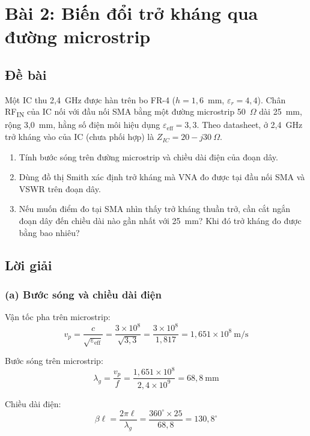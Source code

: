 \documentclass[12pt,a4paper]{article}
\begin{document}
\newpage
\section{Bài 2: Biến đổi trở kháng qua đường microstrip}

\subsection{Đề bài}
Một IC thu 2,4~GHz được hàn trên bo FR-4 ($h = 1{,}6$~mm, $\varepsilon_r = 4{,}4$). Chân RF\textsubscript{IN} của IC nối với đầu nối SMA bằng một đường microstrip 50~$\Omega$ dài 25~mm, rộng 3,0~mm, hằng số điện môi hiệu dụng $\varepsilon_{\text{eff}} = 3{,}3$. Theo datasheet, ở 2,4~GHz trở kháng vào của IC (chưa phối hợp) là $Z_{IC} = 20 - j30~\Omega$.

\begin{enumerate}[label=(\alph*)]
    \item Tính bước sóng trên đường microstrip và chiều dài điện của đoạn dây.
    \item Dùng đồ thị Smith xác định trở kháng mà VNA đo được tại đầu nối SMA và VSWR trên đoạn dây.
    \item Nếu muốn điểm đo tại SMA nhìn thấy trở kháng thuần trở, cần cắt ngắn đoạn dây đến chiều dài nào gần nhất với 25~mm? Khi đó trở kháng đo được bằng bao nhiêu?
\end{enumerate}

\subsection{Lời giải}

\subsubsection{(a) Bước sóng và chiều dài điện}

Vận tốc pha trên microstrip:
\[
v_p = \frac{c}{\sqrt{\varepsilon_{\text{eff}}}} = \frac{3 \times 10^8}{\sqrt{3{,}3}} = \frac{3 \times 10^8}{1{,}817} = 1{,}651 \times 10^8~\text{m/s}
\]

Bước sóng trên microstrip:
\[
\boxed{\lambda_g = \frac{v_p}{f} = \frac{1{,}651 \times 10^8}{2{,}4 \times 10^9} = 68{,}8~\text{mm}}
\]

Chiều dài điện:
\[
\beta\ell = \frac{2\pi \ell}{\lambda_g} = \frac{360^\circ \times 25}{68{,}8} = \boxed{130{,}8^\circ}
\]
\end{document}
